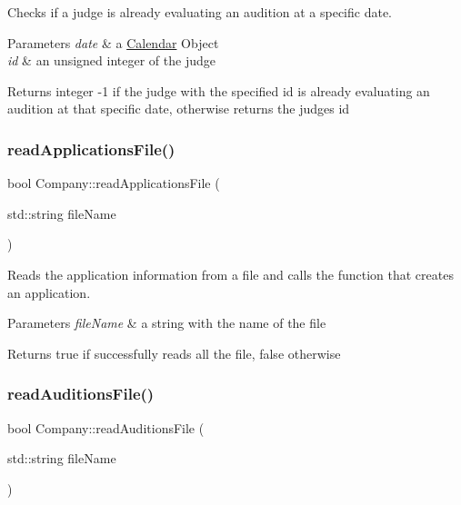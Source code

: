Checks if a judge is already evaluating an audition at a specific date. 


\begin{DoxyParams}{Parameters}
{\em date} & a \hyperlink{class_calendar}{Calendar} Object \\
\hline
{\em id} & an unsigned integer of the judge \\
\hline
\end{DoxyParams}
\begin{DoxyReturn}{Returns}
integer -\/1 if the judge with the specified id is already evaluating an audition at that specific date, otherwise returns the judge\textquotesingle{}s id 
\end{DoxyReturn}
\mbox{\label{class_company_a2be6170874e4695402614a5d8f624f9c}} 
\subsubsection{\texorpdfstring{read\+Applications\+File()}{readApplicationsFile()}}
{\footnotesize\ttfamily bool Company\+::read\+Applications\+File (\begin{DoxyParamCaption}\item[{std\+::string}]{file\+Name }\end{DoxyParamCaption})}



Reads the application information from a file and calls the function that creates an application. 


\begin{DoxyParams}{Parameters}
{\em file\+Name} & a string with the name of the file \\
\hline
\end{DoxyParams}
\begin{DoxyReturn}{Returns}
true if successfully reads all the file, false otherwise 
\end{DoxyReturn}
\mbox{\label{class_company_adecfc6079e977e211786571fc348167b}} 
\subsubsection{\texorpdfstring{read\+Auditions\+File()}{readAuditionsFile()}}
{\footnotesize\ttfamily bool Company\+::read\+Auditions\+File (\begin{DoxyParamCaption}\item[{std\+::string}]{file\+Name }\end{DoxyParamCaption})}



